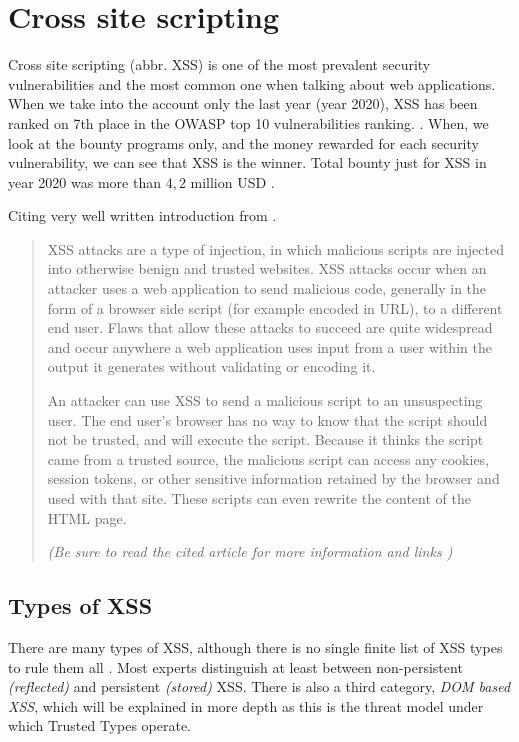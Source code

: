 \chapter{Cross site scripting}

\label{chapter:xss} %

Cross site scripting (abbr. XSS) is one of the most prevalent security vulnerabilities and the most
common one when talking about web applications. When we take into the account only the last year
(year 2020), XSS has been ranked on 7th place in the OWASP top 10 vulnerabilities ranking.
\cite{owasp_top_ten_vulns}. When, we look at the bounty programs only, and the money rewarded for
each security vulnerability, we can see that XSS is the winner. Total bounty just for XSS in year
2020 was more than $4,2$ million USD \cite{top_ten_rewarded_vulns}.

Citing very well written introduction from \cite{xss_owasp_intro}.

\begin{quotation}
  XSS attacks are a type of injection, in which malicious scripts are injected into otherwise benign
  and trusted websites. XSS attacks occur when an attacker uses a web application to send malicious
  code, generally in the form of a browser side script (for example encoded in URL), to a different
  end user. Flaws that allow these attacks to succeed are quite widespread and occur anywhere a web
  application uses input from a user within the output it generates without validating or encoding
  it.

  An attacker can use XSS to send a malicious script to an unsuspecting user. The end user’s browser
  has no way to know that the script should not be trusted, and will execute the script. Because it
  thinks the script came from a trusted source, the malicious script can access any cookies, session
  tokens, or other sensitive information retained by the browser and used with that site. These
  scripts can even rewrite the content of the HTML page.

  \emph{(Be sure to read the cited article for more information and links \cite{xss_owasp_intro})}
\end{quotation}

\section{Types of XSS}
\label{chapter:xss:types}

There are many types of XSS, although there is no single finite list of XSS types to rule them all
\cite{lotr_fellowship}. Most experts distinguish at least between non-persistent \emph{(reflected)}
and persistent \emph{(stored)} XSS. There is also a third category, \emph{DOM based XSS}, which will
be explained in more depth as this is the threat model under which Trusted Types operate.

